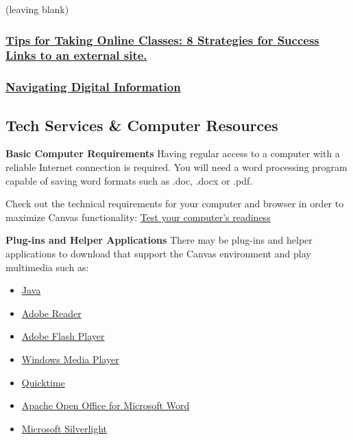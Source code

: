 (leaving blank)

\hypertarget{tips-for-taking-online-classes-8-strategies-for-success-links-to-an-external-site.}{%
\subsubsection{\texorpdfstring{\href{https://www.northeastern.edu/graduate/blog/tips-for-taking-online-classes/}{Tips for Taking Online Classes: 8 Strategies for Success Links to an external site.}}{Tips for Taking Online Classes: 8 Strategies for Success Links to an external site.}}\label{tips-for-taking-online-classes-8-strategies-for-success-links-to-an-external-site.}}

\hypertarget{navigating-digital-information}{%
\subsubsection{\texorpdfstring{\href{https://www.youtube.com/watch?v=pLlv2o6UfTU\&list=PL8dPuuaLjXtN07XYqqWSKpPrtNDiCHTzU}{Navigating Digital Information}}{Navigating Digital Information}}\label{navigating-digital-information}}

\hypertarget{tech-services-computer-resources}{%
\subsection{Tech Services \& Computer Resources}\label{tech-services-computer-resources}}

\textbf{Basic Computer Requirements}
Having regular access to a computer with a reliable Internet connection is required. You will need a word processing program capable of saving word formats such as .doc, .docx or .pdf.

Check out the technical requirements for your computer and browser in order to maximize Canvas functionality: \href{https://apps.3cmediasolutions.org/oei/tools/computer-readiness.html}{Test your computer's readiness}

\textbf{Plug-ins and Helper Applications}
There may be plug-ins and helper applications to download that support the Canvas environment and play multimedia such as:

\begin{itemize}
\tightlist
\item
  \href{https://www.java.com/en/download/}{Java}
\item
  \href{https://get.adobe.com/cn/reader/}{Adobe Reader}
\item
  \href{https://www.flash.cn/}{Adobe Flash Player}
\item
  \href{https://support.microsoft.com/en-us/windows/get-windows-media-player-81718e0d-cfce-25b1-aee3-94596b658287}{Windows Media Player}
\item
  \href{https://support.apple.com/kb/DL837?locale=zh_CN}{Quicktime}
\item
  \href{https://www.openoffice.org/download/index.html}{Apache Open Office for Microsoft Word}
\item
  \href{https://www.microsoft.com/silverlight/}{Microsoft Silverlight}
\end{itemize}

